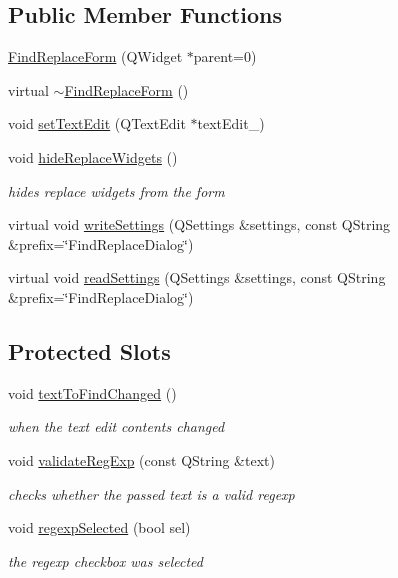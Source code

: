 \subsection*{Public Member Functions}
\begin{DoxyCompactItemize}
\item 
\hyperlink{class_find_replace_form_ad168473a919873f5cf6f9531e9c7faf3}{Find\+Replace\+Form} (Q\+Widget $\ast$parent=0)
\item 
virtual \hyperlink{class_find_replace_form_a5fe44d68f1aa335267c73779871022fa}{$\sim$\+Find\+Replace\+Form} ()
\item 
void \hyperlink{class_find_replace_form_ad621f91f15f0902a050c67e66c839d6f}{set\+Text\+Edit} (Q\+Text\+Edit $\ast$text\+Edit\+\_\+)
\item 
void \hyperlink{class_find_replace_form_acd7c42b7ef674ca414d0e47158fdad31}{hide\+Replace\+Widgets} ()
\begin{DoxyCompactList}\small\item\em hides replace widgets from the form \end{DoxyCompactList}\item 
virtual void \hyperlink{class_find_replace_form_a8746401be4fbab54b6019a76e05e7b43}{write\+Settings} (Q\+Settings \&settings, const Q\+String \&prefix=\char`\"{}Find\+Replace\+Dialog\char`\"{})
\item 
virtual void \hyperlink{class_find_replace_form_a87e0f16b427e570ede2a219b16300c2a}{read\+Settings} (Q\+Settings \&settings, const Q\+String \&prefix=\char`\"{}Find\+Replace\+Dialog\char`\"{})
\end{DoxyCompactItemize}
\subsection*{Protected Slots}
\begin{DoxyCompactItemize}
\item 
void \hyperlink{class_find_replace_form_a0fd7fa8014c190857e5c3be4392fc96a}{text\+To\+Find\+Changed} ()
\begin{DoxyCompactList}\small\item\em when the text edit contents changed \end{DoxyCompactList}\item 
void \hyperlink{class_find_replace_form_a2867ac36c3f8c9accb7f0c010ee74522}{validate\+Reg\+Exp} (const Q\+String \&text)
\begin{DoxyCompactList}\small\item\em checks whether the passed text is a valid regexp \end{DoxyCompactList}\item 
void \hyperlink{class_find_replace_form_acbde49b9b3e2efd6940f8d2e16b9172c}{regexp\+Selected} (bool sel)
\begin{DoxyCompactList}\small\item\em the regexp checkbox was selected \end{DoxyCompactList}\end{DoxyCompactItemize}
